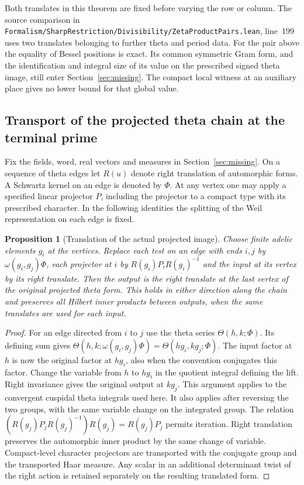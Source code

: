 \documentclass[a4paper,11pt]{article}
\newtheorem{proposition}{Proposition}[section]
\theoremstyle{definition}
\theoremstyle{remark}
\newcommand{\srcloc}[2]{{\small\nolinkurl{#1.lean}}, line~#2}
\numberwithin{equation}{section}
\begin{document}
Both translates in this theorem are fixed before varying the
row or column. The source comparison in
\srcloc{Formalism/SharpRestriction/Divisibility/ZetaProductPairs}{199}
uses two translates belonging to further theta and period data.
For the pair above the equality of Bessel positions is exact.
Its common symmetric Gram form, and the identification and
integral size of its value on the prescribed signed theta image,
still enter Section~\ref{sec:missing}. The compact local witness
at an auxiliary place gives no lower bound for that global value.


\subsection{Transport of the projected theta chain at the terminal prime}\label{sec:thetatransport340}
Fix the fields, word, real vectors and measures in
Section~\ref{sec:missing}. On a sequence of theta edges let $R(u)$
denote right translation of automorphic forms. A Schwartz kernel on
an edge is denoted by $\Phi$. At any vertex one may apply a specified
linear projector $P$, including the projector to a compact type with
its prescribed character. In the following identities the splitting
of the Weil representation on each edge is fixed.

\begin{proposition}[Translation of the actual projected image]\leavevmode\label{prop:thetaimage340}
Choose finite adelic elements $g_i$ at the vertices. Replace each test
on an edge with ends $i,j$ by $\omega(g_i,g_j)\Phi$, each projector
at $i$ by $R(g_i)P_iR(g_i)^{-1}$ and the input at its vertex by its
right translate. Then the output is the right translate at the last
vertex of the original projected theta form. This holds in either
direction along the chain and preserves all Hilbert inner products
between outputs, when the same translates are used for each input.
\end{proposition}
\begin{proof}
For an edge directed from $i$ to $j$ use the theta series
$\Theta(h,k;\Phi)$. Its defining sum gives
$\Theta(h,k;\omega(g_i,g_j)\Phi)=\Theta(hg_i,kg_j;\Phi)$.
The input factor at $h$ is now the original factor at $hg_i$,
also when the convention conjugates this factor. Change the variable
from $h$ to $hg_i$ in the quotient integral defining the lift.
Right invariance gives the original output at $kg_j$. This argument
applies to the convergent cuspidal theta integrals used here. It also
applies after reversing the two groups, with the same variable change
on the integrated group. The relation
$(R(g_j)P_jR(g_j)^{-1})R(g_j)=R(g_j)P_j$ permits iteration.
Right translation preserves the automorphic inner product by the
same change of variable. Compact-level character projectors are
transported with the conjugate group and the transported Haar
measure. Any scalar in an additional determinant twist of the right
action is retained separately on the resulting translated form.
\end{proof}
\end{document}
